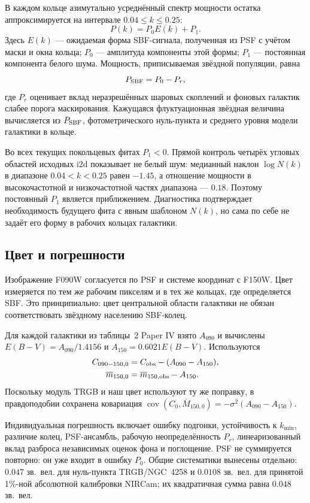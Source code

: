 \documentclass[10pt,a4paper,twocolumn]{article}
\newcommand{\mbar}{\overline{m}}
\newcommand{\Mbar}{\overline{M}}
\begin{document}
В каждом кольце азимутально усреднённый спектр мощности остатка
аппроксимируется на интервале $0.04\leq k\leq0.25$:
\begin{equation}
 P(k)=P_0E(k)+P_1.
\end{equation}
Здесь $E(k)$ --- ожидаемая форма SBF-сигнала, полученная из PSF с учётом
маски и окна кольца; $P_0$ --- амплитуда компоненты этой формы; $P_1$ ---
постоянная компонента белого шума. Мощность, приписываемая звёздной популяции,
равна
\begin{equation}
 P_{\rm SBF}=P_0-P_r,
\end{equation}
где $P_r$ оценивает вклад неразрешённых шаровых скоплений и фоновых галактик
слабее порога маскирования. Кажущаяся флуктуационная звёздная величина
вычисляется из $P_{\rm SBF}$, фотометрического нуль-пункта и среднего уровня
модели галактики в кольце.

Во всех текущих покольцевых фитах $P_1<0$. Прямой контроль четырёх угловых
областей исходных i2d показывает не белый шум: медианный наклон
$\log N(k)$ в диапазоне $0.04<k<0.25$ равен $-1.45$, а отношение мощности
в высокочастотной и низкочастотной частях диапазона --- $0.18$. Поэтому
постоянный $P_1$ является приближением. Диагностика подтверждает необходимость
будущего фита с явным шаблоном $N(k)$, но сама по себе не задаёт его форму в
рабочих кольцах галактики.

\subsection{Цвет и погрешности}

Изображение F090W согласуется по PSF и системе координат с F150W. Цвет
измеряется по тем же рабочим пикселям и в тех же кольцах, где определяется
SBF. Это принципиально: цвет центральной области галактики не обязан
соответствовать звёздному населению SBF-колец.

Для каждой галактики из таблицы~2 Paper IV взято $A_{090}$ и вычислены
$E(B-V)=A_{090}/1.4156$ и $A_{150}=0.6021E(B-V)$. Используются
\begin{align}
 C_{090-150,0}&=C_{\rm obs}-(A_{090}-A_{150}),\\
 \mbar_{150,0}&=\mbar_{150,\rm obs}-A_{150}.
\end{align}
Поскольку модуль TRGB и наш цвет используют ту же поправку, в правдоподобии
сохранена ковариация
$\operatorname{cov}(C_0,\Mbar_{150,0})=-\sigma^2(A_{090}-A_{150})$.

Индивидуальная погрешность включает ошибку подгонки, устойчивость к
$k_{\min}$, различие колец, PSF-ансамбль, рабочую неопределённость $P_r$,
линеаризованный вклад разброса независимых оценок фона и поглощение.
PSF не суммируется повторно: он уже входит в ошибку $P_0$. Общие систематики
вынесены отдельно: $0.047$ зв.\ вел. для нуль-пункта TRGB/NGC~4258 и
$0.0108$ зв.\ вел. для принятой 1\%-ной абсолютной калибровки NIRCam;
их квадратичная сумма равна $0.048$ зв.\ вел.
\end{document}
